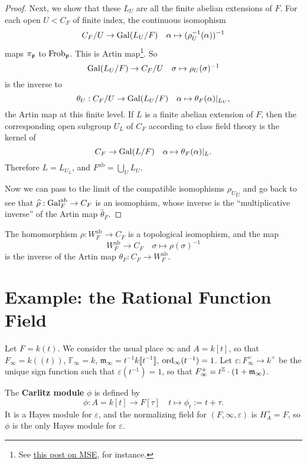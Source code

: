 \documentclass{article}
\newcommand{\F}{\mathbb{F}}
\newcommand{\m}{\mathfrak{m}}
\DeclareMathOperator{\frob}{Frob}
\newcommand{\llpar}{(\!(}
\newcommand{\rrpar}{)\!)}
\newcommand{\ab}{\mathrm{ab}}
\begin{document}
\begin{proof}
Next, we show that these $L_U$ are all the finite abelian extensions of $F$.
For each open $U < C_F$ of finite index,
the continuous isomophism\[C_F/U\to \operatorname{Gal}(L_U/F)\quad \alpha\mapsto (\rho_U^{-1}(\alpha))^{-1}\]
maps $\pi_{\mathfrak{p}}$ to $\frob_\p$. This is Artin map\footnote{
    See \href{https://math.stackexchange.com/questions/1361278/which-properties-determine-the-uniqueness-of-the-global-artin-map?rq=1}{this post on MSE}, for instance.
}.
So \[\operatorname{Gal}(L_U/F)\to C_F/U\quad \sigma\mapsto \rho_U(\sigma)^{-1}\]
is the inverse to \[\theta_U : C_F/U\to \operatorname{Gal}(L_U/F)\quad \alpha\mapsto\theta_F(\alpha)|_{L_U},\]
the Artin map at this finite level.
If $L$ is a finite abelian extension of $F$,
then the corresponding open subgroup $U_L$ of $C_F$
according to class field theory is the kernel of
\[C_F\to \operatorname{Gal}(L/F)\quad \alpha\mapsto\theta_F(\alpha)|_{L}.\]
Therefore $L = L_{U_L}$,
and $F^\ab = \bigcup_{U}L_U$.

Now we can pass to the limit of the compatible isomophisms ${\rho_U}_U$ and go back to see that $\hat\rho : \gal_F^\ab\to C_F$ is an isomophism,
whose inverse is the ``multiplicative inverse'' of the Artin map $\hat\theta_F$.
\end{proof}

\begin{corollary}
    The homomorphism $\rho : W_F^\ab\to C_F$ is a topological isomophism, and the map \[W_F^\ab\to C_F\quad \sigma\mapsto \rho(\sigma)^{-1}\]
    is the inverse of the Artin map $\theta_F : C_F\to W_F^\ab$.
\end{corollary}

\section{Example: the Rational Function Field}
Let $F = k(t)$.
We consider the usual place $\infty$ and $A = k[t]$,
so that $F_\infty = k\llpar t\rrpar$,
$\F_\infty = k$,
$\m_\infty = t^{-1}k\llbracket t^{-1}\rrbracket$,
$\operatorname{ord}_{\infty}(t^{-1}) = 1$.
Let $\varepsilon : F_\infty^\times\to k^\times$ be the unique sign function such that $\varepsilon(t^{-1}) = 1$,
so that $F_\infty^+ = t^{\Z}\cdot(1 + \m_\infty)$.


The \textbf{Carlitz module} $\phi$ is defined by \[\phi : A = k[t]\to F[\tau]\quad t\mapsto \phi_t := t + \tau.\]
It is a Hayes module for $\varepsilon$, and the normalizing field for $(F, \infty, \varepsilon)$ is $H_A^+ = F$,
so $\phi$ is the only Hayes module for $\varepsilon$.
\end{document}
